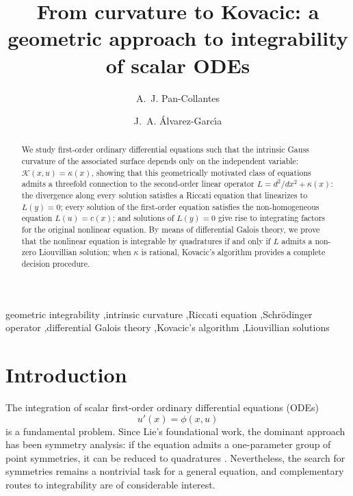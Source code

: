 \documentclass[preprint,a4paper]{elsarticle}
\begin{document}
\begin{frontmatter}

\title{From curvature to Kovacic: a geometric approach to integrability of scalar ODEs}

\author[uca]{A.~J. Pan-Collantes}

\author[iesj]{J.~A. \'{A}lvarez-Garc\'{\i}a}

\address[uca]{Departamento de Matem\'aticas, Universidad de C\'adiz -- UCA, Puerto Real, Spain}
\address[iesj]{Departamento de Matem\'aticas, IES Jorge Juan, Junta de Andaluc\'\i{}a, San Fernando, Spain}

\begin{abstract}
We study first-order ordinary differential equations such that the intrinsic Gauss curvature of the associated surface depends only on the independent variable: $\mathcal{K}(x,u)=\kappa(x)$, showing that this geometrically motivated class of equations admits a threefold connection to the second-order linear operator $L=d^2/dx^2+\kappa(x)$: the divergence along every solution satisfies a Riccati equation that linearizes to $L(y)=0$; every solution of the first-order equation satisfies the non-homogeneous equation $L(u)=c(x)$; and solutions of $L(y)=0$ give rise to integrating factors for the original nonlinear equation. By means of differential Galois theory, we prove that the nonlinear equation is integrable by quadratures if and only if $L$ admits a non-zero Liouvillian solution; when $\kappa$ is rational, Kovacic's algorithm provides a complete decision procedure.
\end{abstract}

\begin{keyword}
geometric integrability \sep intrinsic curvature \sep Riccati equation \sep Schr\"{o}dinger operator \sep differential Galois theory \sep Kovacic's algorithm \sep Liouvillian solutions
\end{keyword}

\end{frontmatter}


\section{Introduction}\label{sec:intro}

The integration of scalar first-order ordinary differential equations (ODEs) 
\begin{equation}\label{eq:ode1_intro}
u'(x) = \phi(x, u)
\end{equation}
is a fundamental problem. Since Lie's foundational work, the dominant approach has been symmetry analysis: if the equation admits a one-parameter group of point symmetries, it can be reduced to quadratures \cite{Olver1993, BlumanAnco2002, Stephani1989}. Nevertheless, the search for symmetries remains a nontrivial task for a general equation, and complementary routes to integrability are of considerable interest.
\end{document}
